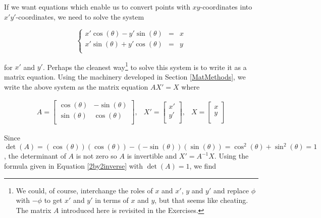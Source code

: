 \documentclass{ximera}
\begin{document}
\smallskip

If we want equations which enable us to convert points with $xy$-coordinates into $x'y'$-coordinates, we need to solve the system

\vspace{-.05in}

\[ \left\{ \begin{array}{rcl} x' \cos(\theta) - y' \sin(\theta) & = & x \\ x'\sin(\theta) + y'\cos(\theta) & = & y \\ \end{array} \right.\]

for $x'$ and $y'$. Perhaps the cleanest way\footnote{We could, of course, interchange the roles of $x$ and $x'$, $y$ and $y'$ and replace $\phi$ with $-\phi$ to get $x'$ and $y'$ in terms of $x$ and $y$, but that seems like cheating.  The matrix $A$ introduced here is revisited in the Exercises.} to solve this system is to write it as a matrix equation. Using the machinery developed in Section \ref{MatMethods}, we write the above system as the matrix equation $AX' = X$ where

\vspace{-.05in}

\[ \begin{array}{ccc}

A = \left[ \begin{array}{rr} \cos(\theta) & -\sin(\theta) \\ \sin(\theta) & \cos(\theta) \\ \end{array} \right], 

&

X'= \left[ \begin{array}{c}x' \\ y'\\ \end{array} \right],

&

X= \left[ \begin{array}{c}x \\ y\\ \end{array} \right]


\end{array} \]

Since $\det(A) = (\cos(\theta))(\cos(\theta)) - (-\sin(\theta))(\sin(\theta)) = \cos^{2}(\theta) + \sin^{2}(\theta) = 1$, the determinant of $A$ is not zero so $A$ is invertible and  $X' = A^{-1}X$.  Using the  formula given in Equation \ref{2by2inverse} with $\det(A) = 1$, we find
\end{document}
